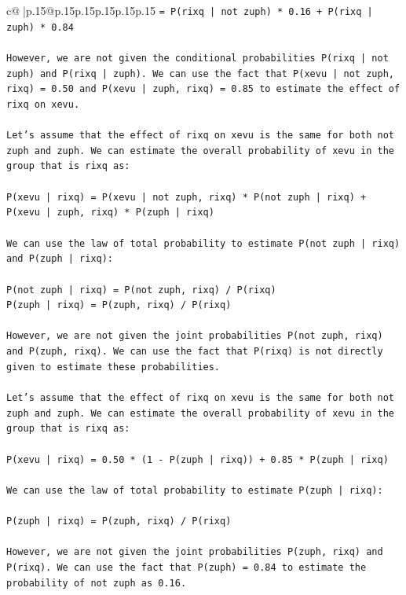 \documentclass{article}
\begin{document}
{\begin{supertabular}{c@{$\;$}|p{.15\linewidth}@{}p{.15\linewidth}p{.15\linewidth}p{.15\linewidth}p{.15\linewidth}p{.15\linewidth}}
{{{\texttt{= P(rixq | not zuph) * 0.16 + P(rixq | zuph) * 0.84} \\
\\ 
\texttt{However, we are not given the conditional probabilities P(rixq | not zuph) and P(rixq | zuph). We can use the fact that P(xevu | not zuph, rixq) = 0.50 and P(xevu | zuph, rixq) = 0.85 to estimate the effect of rixq on xevu.} \\
\\ 
\texttt{Let's assume that the effect of rixq on xevu is the same for both not zuph and zuph. We can estimate the overall probability of xevu in the group that is rixq as:} \\
\\ 
\texttt{P(xevu | rixq) = P(xevu | not zuph, rixq) * P(not zuph | rixq) + P(xevu | zuph, rixq) * P(zuph | rixq)} \\
\\ 
\texttt{We can use the law of total probability to estimate P(not zuph | rixq) and P(zuph | rixq):} \\
\\ 
\texttt{P(not zuph | rixq) = P(not zuph, rixq) / P(rixq)} \\
\texttt{P(zuph | rixq) = P(zuph, rixq) / P(rixq)} \\
\\ 
\texttt{However, we are not given the joint probabilities P(not zuph, rixq) and P(zuph, rixq). We can use the fact that P(rixq) is not directly given to estimate these probabilities.} \\
\\ 
\texttt{Let's assume that the effect of rixq on xevu is the same for both not zuph and zuph. We can estimate the overall probability of xevu in the group that is rixq as:} \\
\\ 
\texttt{P(xevu | rixq) = 0.50 * (1 {-} P(zuph | rixq)) + 0.85 * P(zuph | rixq)} \\
\\ 
\texttt{We can use the law of total probability to estimate P(zuph | rixq):} \\
\\ 
\texttt{P(zuph | rixq) = P(zuph, rixq) / P(rixq)} \\
\\ 
\texttt{However, we are not given the joint probabilities P(zuph, rixq) and P(rixq). We can use the fact that P(zuph) = 0.84 to estimate the probability of not zuph as 0.16.} \\
\\ 
}}}
\end{supertabular}}
\end{document}
